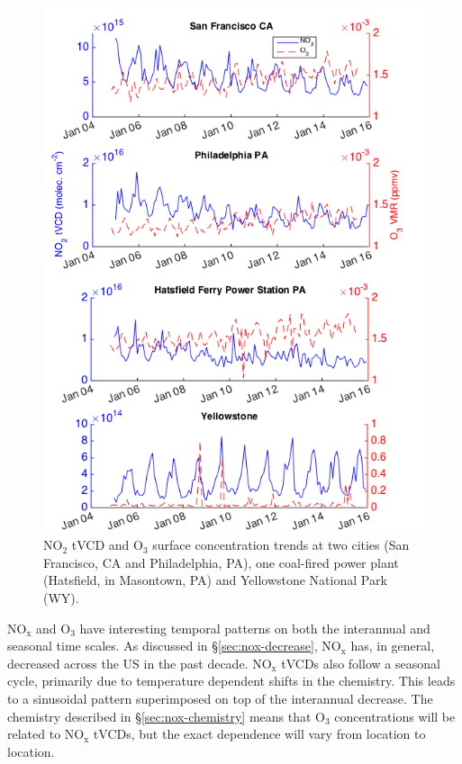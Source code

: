 \documentclass[a4paper,10pt,oneside]{article}
\newcommand{\ce}[1]{$\mathrm{#1}$}
\begin{document}
\begin{sloppy}
\begin{figure}
\centering
\includegraphics[width=0.95\columnwidth]{figs/four-site-trends.png} 
\caption{\ce{NO_2} tVCD and \ce{O_3} surface concentration trends at two cities (San Francisco, CA and Philadelphia, PA), one coal-fired power plant (Hatsfield, in Masontown, PA) and Yellowstone National Park (WY).}
\label{fig:trends}
\end{figure}

\ce{NO_x} and \ce{O_3} have interesting temporal patterns on both the interannual and seasonal time scales. As discussed in \S\ref{sec:nox-decrease}, \ce{NO_x} has, in general, decreased across the US in the past decade. \ce{NO_x} tVCDs also follow a seasonal cycle, primarily due to temperature dependent shifts in the chemistry. This leads to a sinusoidal pattern superimposed on top of the interannual decrease.  The chemistry described in \S\ref{sec:nox-chemistry} means that \ce{O_3} concentrations will be related to \ce{NO_x} tVCDs, but the exact dependence will vary from location to location.


\end{sloppy}
\end{document}
